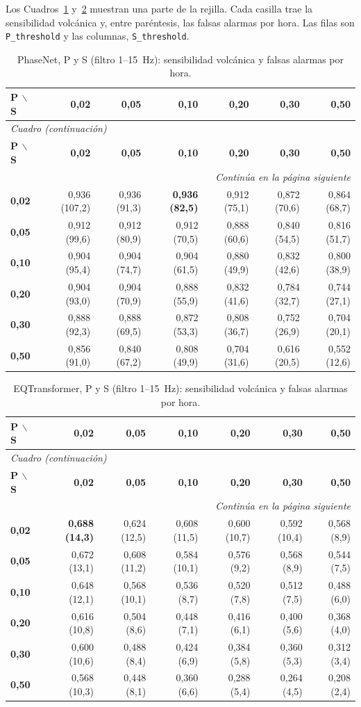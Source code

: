 \documentclass[11pt,a4paper,oneside,spanish,oldfontcommands]{memoir}
\newcommand{\cabecera}[2]{%
  \toprule #1 \\ \midrule \endfirsthead
  \multicolumn{#2}{l}{\itshape Cuadro \thetable{} (continuación)}\\
  \toprule #1 \\ \midrule \endhead
  \midrule \multicolumn{#2}{r}{\itshape Continúa en la página siguiente}\\ \endfoot
  \bottomrule \endlastfoot}
\begin{document}
Los Cuadros~\ref{tab:ps-pn} y~\ref{tab:ps-eqt} muestran una parte de la
rejilla. Cada casilla trae la sensibilidad volcánica y, entre paréntesis, las
falsas alarmas por hora. Las filas son \texttt{P\_threshold} y las columnas,
\texttt{S\_threshold}.

{\small
\setlength{\tabcolsep}{3pt}
\begin{longtable}{lrrrrrr}
\caption{PhaseNet, P y S (filtro 1--15~Hz): sensibilidad volcánica y falsas alarmas por hora.}\label{tab:ps-pn}\\
\cabecera{\textbf{P $\backslash$ S} & \textbf{0,02} & \textbf{0,05} & \textbf{0,10} & \textbf{0,20} & \textbf{0,30} & \textbf{0,50}}{7}
\textbf{0,02} & 0,936 (107,2) & 0,936 (91,3) & \textbf{0,936 (82,5)} & 0,912 (75,1) & 0,872 (70,6) & 0,864 (68,7) \\
\textbf{0,05} & 0,912 (99,6) & 0,912 (80,9) & 0,912 (70,5) & 0,888 (60,6) & 0,840 (54,5) & 0,816 (51,7) \\
\textbf{0,10} & 0,904 (95,4) & 0,904 (74,7) & 0,904 (61,5) & 0,880 (49,9) & 0,832 (42,6) & 0,800 (38,9) \\
\textbf{0,20} & 0,904 (93,0) & 0,904 (70,9) & 0,888 (55,9) & 0,832 (41,6) & 0,784 (32,7) & 0,744 (27,1) \\
\textbf{0,30} & 0,888 (92,3) & 0,888 (69,5) & 0,872 (53,3) & 0,808 (36,7) & 0,752 (26,9) & 0,704 (20,1) \\
\textbf{0,50} & 0,856 (91,0) & 0,840 (67,2) & 0,808 (49,9) & 0,704 (31,6) & 0,616 (20,5) & 0,552 (12,6) \\
\end{longtable}
}

{\small
\setlength{\tabcolsep}{3pt}
\begin{longtable}{lrrrrrr}
\caption{EQTransformer, P y S (filtro 1--15~Hz): sensibilidad volcánica y falsas alarmas por hora.}\label{tab:ps-eqt}\\
\cabecera{\textbf{P $\backslash$ S} & \textbf{0,02} & \textbf{0,05} & \textbf{0,10} & \textbf{0,20} & \textbf{0,30} & \textbf{0,50}}{7}
\textbf{0,02} & \textbf{0,688 (14,3)} & 0,624 (12,5) & 0,608 (11,5) & 0,600 (10,7) & 0,592 (10,4) & 0,568 (8,9) \\
\textbf{0,05} & 0,672 (13,1) & 0,608 (11,2) & 0,584 (10,1) & 0,576 (9,2) & 0,568 (8,9) & 0,544 (7,5) \\
\textbf{0,10} & 0,648 (12,1) & 0,568 (10,1) & 0,536 (8,7) & 0,520 (7,8) & 0,512 (7,5) & 0,488 (6,0) \\
\textbf{0,20} & 0,616 (10,8) & 0,504 (8,6) & 0,448 (7,1) & 0,416 (6,1) & 0,400 (5,6) & 0,368 (4,0) \\
\textbf{0,30} & 0,600 (10,6) & 0,488 (8,4) & 0,424 (6,9) & 0,384 (5,8) & 0,360 (5,3) & 0,312 (3,4) \\
\textbf{0,50} & 0,568 (10,3) & 0,448 (8,1) & 0,360 (6,6) & 0,288 (5,4) & 0,264 (4,5) & 0,208 (2,4) \\
\end{longtable}
}
\end{document}
